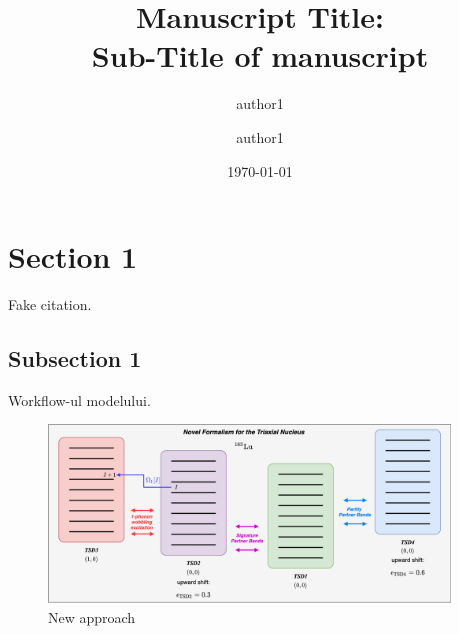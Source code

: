 \documentclass[%
 reprint,
 amsmath,
 amssymb,
 aps,
]{revtex4-2}
\begin{document}
\title{Manuscript Title:\\Sub-Title of manuscript }%

\author{author1}%
\author{author1}%
%


\date{\today}

\begin{abstract}
\lipsum[1]
\end{abstract}

\maketitle


\section{Section 1}

\lipsum[1-4] Fake citation.

\subsection{Subsection 1}

\lipsum[1-4]

Workflow-ul modelului.

\begin{figure}[h]
    \centering
    \includegraphics[width=0.95\textwidth]{./images/diagrams/double_shift_fit_workflow.png}
    \caption{New approach}
    \label{fig:band-structure}
\end{figure}



\end{document}
